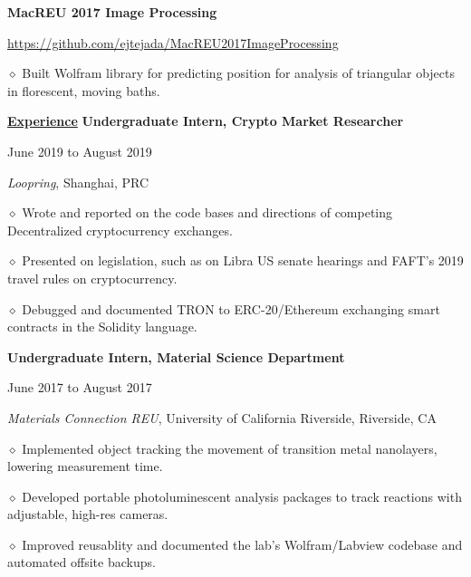 \documentclass [11pt]{article}
\begin{document}
\begin{flushleft}
\textbf{MacREU 2017 Image Processing}\begin{minipage}{0.71 \linewidth}\begin{flushright}\href{https://github.com/ejtejada/MacREU2017ImageProcessing}{https://github.com/ejtejada/MacREU2017ImageProcessing}\end{flushright}\end{minipage}

‭‭\quad\quad\quad$\diamond$ ‭Built Wolfram library for predicting position for analysis of triangular objects in florescent, moving baths.

\underline{\textbf{Experience}}
\linebreak
\textbf{Undergraduate Intern, Crypto Market Researcher}\begin{minipage}{0.55 \linewidth}\begin{flushright}June 2019 to August 2019\end{flushright}\end{minipage}
\emph{Loopring}, Shanghai, PRC

‭‭\quad\quad\quad$\diamond$ ‭Wrote and reported on the code bases and directions of competing Decentralized cryptocurrency exchanges.

‭‭\quad\quad\quad$\diamond$ Presented on legislation, such as on Libra US senate hearings and FAFT’s 2019 travel rules on cryptocurrency.

‭‭\quad\quad\quad$\diamond$ Debugged and documented TRON to ERC-20/Ethereum exchanging smart contracts in the Solidity language.

\linebreak
\textbf{Undergraduate Intern, Material Science Department}\begin{minipage}{0.535 \linewidth}\begin{flushright}June 2017 to August 2017\end{flushright}\end{minipage}
\emph{Materials Connection REU}, University of California Riverside, Riverside, CA

‭‭\quad\quad\quad$\diamond$ ‭Implemented object tracking the movement of transition metal nanolayers, lowering measurement time.

‭‭\quad\quad\quad$\diamond$ Developed portable photoluminescent analysis packages to track reactions with adjustable, high-res cameras.

‭‭\quad\quad\quad$\diamond$ Improved reusablity and documented the lab’s Wolfram/Labview codebase and automated offsite backups.


\end{flushleft}
\end{document}
